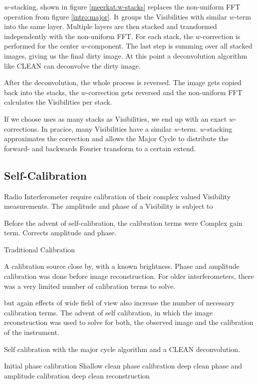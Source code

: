 $w$-stacking, shown in figure \ref{meerkat:w-stacks} replaces the non-uniform FFT operation from figure \ref{intro:major}. It groups the Visibilities with similar $w$-term into the same layer. Multiple layers are then stacked and transformed independently with the non-uniform FFT. For each stack, the $w$-correction is performed for the center $w$-component. The last step is summing over all stacked images, giving us the final dirty image. At this point a deconvolution algorithm like CLEAN can deconvolve the dirty image. 

After the deconvolution, the whole process is reversed. The image gets copied back into the stacks, the $w$-correction gets reversed and the non-uniform FFT calculates the Visibilities per stack.

If we choose uses as many stacks as Visibilities, we end up with an exact $w$-corrections. In pracice, many Visibilities have a similar $w$-term. $w$-stacking approximates the correction and allows the Major Cycle to distribute the forward- and backwards Fourier transform to a certain extend.

\subsection{Self-Calibration}
Radio Interferometer require calibration of their complex valued Visibility measurements. The amplitude and phase of a Visibility is subject to 

Before the advent of self-calibration, the calibration terms were 
Complex gain term. Corrects amplitude and phase. 

Traditional Calibration

A calibration source close by, with a known brightness. Phase and amplitude calibration was done before image reconstruction. For older interferometers, there was a very limited number of calibration terms to solve.


but again effects of wide field of view also increase the number of necessary calibration terms. The advent of self calibration, in which the image reconstruction was used to solve for both, the observed image and the calibration of the instrument.

Self calibration with the major cycle algorithm and a CLEAN deconvolution.

Initial phase calibration
Shallow clean
phase calibration
deep clean
phase and amplitude calibration
deep clean
reconstruction







